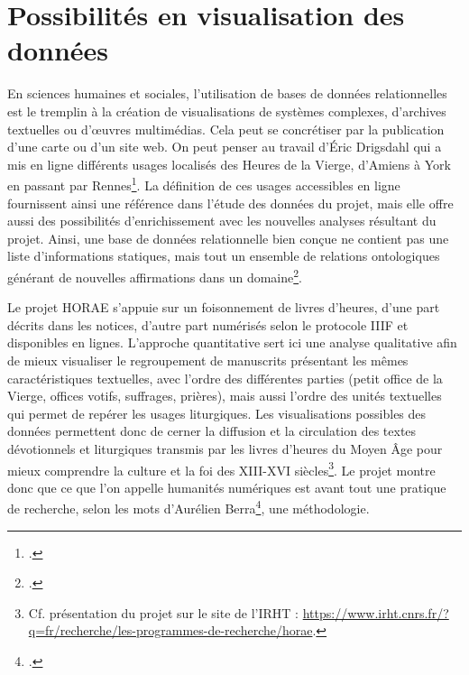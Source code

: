 \documentclass[a4paper,12pt,twoside]{book}
\begin{document}
	\section{Possibilités en visualisation des données}

	En sciences humaines et sociales, l'utilisation de bases de données relationnelles est le tremplin à la création de visualisations de systèmes complexes, d'archives textuelles ou d'œuvres multimédias. Cela peut se concrétiser par la publication d'une carte ou d'un site web. On peut penser au travail d'Éric Drigsdahl qui a mis en ligne différents usages localisés des Heures de la Vierge, d'Amiens à York en passant par Rennes\footcite{Usages_HVierge}. La définition de ces usages accessibles en ligne fournissent ainsi une référence dans l'étude des données du projet, mais elle offre aussi des possibilités d'enrichissement avec les nouvelles analyses résultant du projet. Ainsi, une base de données relationnelle bien conçue ne contient pas une liste d'informations statiques, mais tout un ensemble de relations ontologiques générant de nouvelles affirmations dans un domaine\footcite[Partie II, Chapitre 15]{Compagnon_DH}. 
	
	Le projet HORAE s'appuie sur un foisonnement de livres d'heures, d'une part décrits dans les notices, d'autre part numérisés selon le protocole IIIF et disponibles en lignes. L'approche quantitative sert ici une analyse qualitative afin de mieux visualiser le regroupement de manuscrits présentant les mêmes caractéristiques textuelles, avec l’ordre des différentes parties (petit office de la Vierge, offices votifs, suffrages, prières), mais aussi l’ordre des unités textuelles qui permet de repérer les usages liturgiques. Les visualisations possibles des données permettent donc de cerner la diffusion et la circulation des textes dévotionnels et liturgiques transmis par les livres d’heures du Moyen Âge pour mieux comprendre la culture et la foi des \textsc{XIII}-\textsc{XVI} siècles\footnote{Cf. présentation du projet sur le site de l'IRHT : \url{https://www.irht.cnrs.fr/?q=fr/recherche/les-programmes-de-recherche/horae}.}. Le projet montre donc que ce que l'on appelle \og humanités numériques\fg{} est avant tout une \og pratique de recherche\fg{}, selon les mots d'Aurélien Berra\footcite{Faire_HN}, une méthodologie.
	
\end{document}
